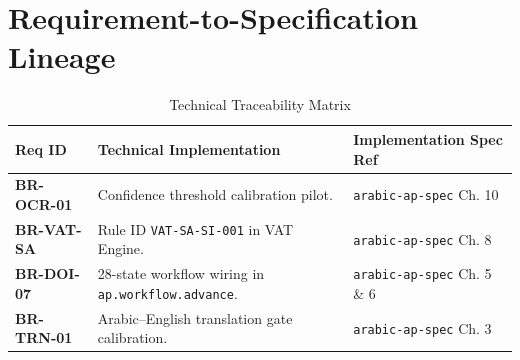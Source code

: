 \chapter{Requirement-to-Specification Lineage}
\label{ch:lineage}

\begin{longtable}{p{2cm} p{6cm} p{6cm}}
\caption{Technical Traceability Matrix} \\
\toprule
\textbf{Req ID} & \textbf{Technical Implementation} & \textbf{Implementation Spec Ref} \\
\midrule
\rowcolor{sapamber!5}
\textbf{BR-OCR-01} & Confidence threshold calibration pilot. & \texttt{arabic-ap-spec} Ch. 10 \\
\textbf{BR-VAT-SA} & Rule ID \texttt{VAT-SA-SI-001} in VAT Engine. & \texttt{arabic-ap-spec} Ch. 8 \\
\rowcolor{sapamber!5}
\textbf{BR-DOI-07} & 28-state workflow wiring in \texttt{ap.workflow.advance}. & \texttt{arabic-ap-spec} Ch. 5 \& 6 \\
\textbf{BR-TRN-01} & Arabic--English translation gate calibration. & \texttt{arabic-ap-spec} Ch. 3 \\
\bottomrule
\end{longtable}
